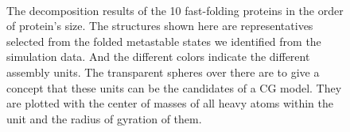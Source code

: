 \documentclass[12pt]{article}
\begin{document}
\begin{figure}[htbp]
  \\
  \caption{\label{all_beads}The decomposition results of the 10 fast-folding proteins in the order of protein's size. The structures shown here are representatives selected from the folded metastable states we identified from the simulation data. And the different colors indicate the different assembly units. The transparent spheres over there are to give a concept that these units can be the candidates of a CG model. They are plotted with the center of masses of all heavy atoms within the unit and the radius of gyration of them.}
\end{figure}

\setlength{\parindent}{2em}
\end{document}
